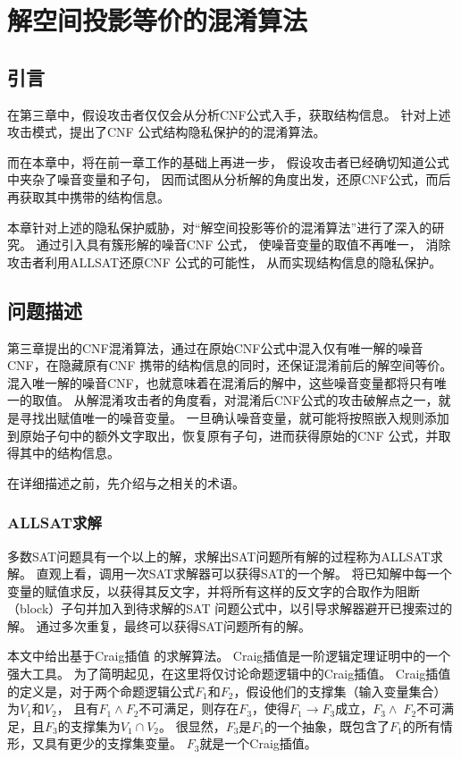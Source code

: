 \chapter{解空间投影等价的混淆算法}
\label{chap:4}

\section{引言}%
在第三章中，假设攻击者仅仅会从分析CNF公式入手，获取结构信息。
针对上述攻击模式，提出了CNF 公式结构隐私保护的的混淆算法。

而在本章中，将在前一章工作的基础上再进一步，
假设攻击者已经确切知道公式中夹杂了噪音变量和子句，
因而试图从分析解的角度出发，还原CNF公式，而后再获取其中携带的结构信息。

本章针对上述的隐私保护威胁，对“解空间投影等价的混淆算法”进行了深入的研究。
通过引入具有簇形解的噪音CNF 公式，
使噪音变量的取值不再唯一，
消除攻击者利用ALLSAT还原CNF 公式的可能性，
从而实现结构信息的隐私保护。

\section{问题描述}
第三章提出的CNF混淆算法，通过在原始CNF公式中混入仅有唯一解的噪音CNF，在隐藏原有CNF 携带的结构信息的同时，还保证混淆前后的解空间等价。
混入唯一解的噪音CNF，也就意味着在混淆后的解中，这些噪音变量都将只有唯一的取值。
从解混淆攻击者的角度看，对混淆后CNF公式的攻击破解点之一，就是寻找出赋值唯一的噪音变量。
一旦确认噪音变量，就可能将按照嵌入规则添加到原始子句中的额外文字取出，恢复原有子句，进而获得原始的CNF 公式，并取得其中的结构信息。

在详细描述之前，先介绍与之相关的术语。
\subsection{ALLSAT求解}
多数SAT问题具有一个以上的解，求解出SAT问题所有解的过程称为ALLSAT求解。
直观上看，调用一次SAT求解器可以获得SAT的一个解。
将已知解中每一个变量的赋值求反，以获得其反文字，并将所有这样的反文字的合取作为阻断（block）子句并加入到待求解的SAT 问题公式中，以引导求解器避开已搜索过的解。
通过多次重复，最终可以获得SAT问题所有的解。

本文中给出基于Craig插值 的求解算法。
Craig插值是一阶逻辑定理证明中的一个强大工具。
为了简明起见，在这里将仅讨论命题逻辑中的Craig插值。
Craig插值的定义是，对于两个命题逻辑公式$F_1$和$F_2$，假设他们的支撑集（输入变量集合）为$V_1$和$V_2$，
且有$F_1\wedge F_2$不可满足，则存在$F_3$，使得$F_1\rightarrow F_3$成立，$F_3\wedgeF_2$不可满足，且$F_3$的支撑集为$V_1\cap V_2$。
很显然，$F_3$是$F_1$的一个抽象，既包含了$F_1$的所有情形，又具有更少的支撑集变量。
$F_3$就是一个Craig插值。

